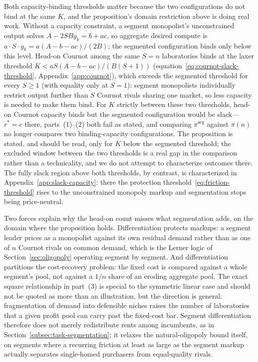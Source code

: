 \documentclass[11pt]{article}
\begin{document}
Both capacity-binding thresholds matter because the two configurations do not bind at the same $K$, and the proposition's domain restriction above is doing real work. Without a capacity constraint, a segment monopolist's unconstrained output solves $A-2SBy_k=b+ac$, so aggregate desired compute is $a\cdot S\cdot y_k=a(A-b-ac)/(2B)$; the segmented configuration binds only below this level. Head-on Cournot among the same $S=n$ laboratories binds at the laxer threshold $K<aS(A-b-ac)/(B(S+1))$ (equation~\eqref{eq:cournot-slack-threshold}, Appendix~\ref{app:cournot}), which exceeds the segmented threshold for every $S\geq1$ (with equality only at $S=1$): segment monopolists individually restrict output further than $S$ Cournot rivals sharing one market, so less capacity is needed to make them bind. For $K$ strictly between these two thresholds, head-on Cournot capacity binds but the segmented configuration would be slack---$r^*=c$ there, parts~(1)--(2) both fail as stated, and comparing $\pi^{\mathrm{seg}}$ against $\pi(n)$ no longer compares two binding-capacity configurations. The proposition is stated, and should be read, only for $K$ below the segmented threshold; the excluded window between the two thresholds is a real gap in the comparison rather than a technicality, and we do not attempt to characterize outcomes there. The fully slack region above both thresholds, by contrast, is characterized in Appendix~\ref{app:slack-capacity}: there the protection threshold~\eqref{eq:friction-threshold} rises to the unconstrained monopoly markup and segmentation stops being price-neutral.

Two forces explain why the head-on count misses what segmentation adds, on the domain where the proposition holds. Differentiation protects markups: a segment leader prices as a monopolist against its own residual demand rather than as one of $n$ Cournot rivals on common demand, which is the Lerner logic of Section~\ref{sec:oligopoly} operating segment by segment. And differentiation partitions the cost-recovery problem: the fixed cost is compared against a whole segment's pool, not against a $1/n$ share of an eroding aggregate pool. The exact square relationship in part~(3) is special to the symmetric linear case and should not be quoted as more than an illustration, but the direction is general: fragmentation of demand into defensible niches raises the number of laboratories that a given profit pool can carry past the fixed-cost bar. Segment differentiation therefore does not merely redistribute rents among incumbents, as in Section~\ref{subsec:task-segmentation}; it relaxes the natural-oligopoly bound itself, on segments where a recurring friction at least as large as the segment markup actually separates single-homed purchasers from equal-quality rivals.
\end{document}
